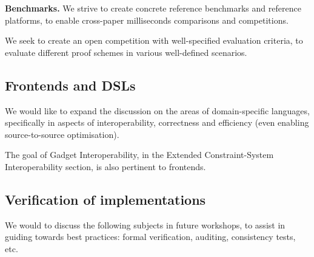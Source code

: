 \textbf{Benchmarks.}
We strive to create concrete reference benchmarks and reference platforms, to enable cross-paper milliseconds comparisons and competitions.

We seek to create an open competition with well-specified evaluation criteria, to evaluate different proof schemes in various well-defined scenarios.


\subsection{Frontends and DSLs}
\label{implem:goals:frontends-and-DSLs}

We would like to expand the discussion on the areas of domain-specific languages, specifically in aspects of interoperability, correctness and efficiency (even enabling source-to-source optimisation).

The goal of Gadget Interoperability, in the Extended Constraint-System Interoperability section, is also pertinent to frontends.


\subsection{Verification of implementations}
\label{implem:goals:verification-of-implementations}

We would to discuss the following subjects in future workshops, to assist in guiding towards best practices: formal verification, auditing, consistency tests, etc.

